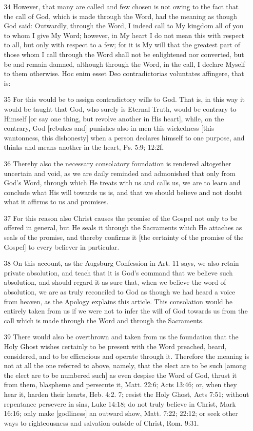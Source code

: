 {34 However, that many are called and few chosen is not owing to the fact that the call of God, which is made through the Word, had the meaning as though God said: Outwardly, through the Word, I indeed call to My kingdom all of you to whom I give My Word; however, in My heart I do not mean this with respect to all, but only with respect to a few; for it is My will that the greatest part of those whom I call through the Word shall not be enlightened nor converted, but be and remain damned, although through the Word, in the call, I declare Myself to them otherwise. Hoc enim esset Deo contradictorias voluntates affingere, that is:

35 For this would be to assign contradictory wills to God. That is, in this way it would be taught that God, who surely is Eternal Truth, would be contrary to Himself [or say one thing, but revolve another in His heart], while, on the contrary, God [rebukes and] punishes also in men this wickedness [this wantonness, this dishonesty] when a person declares himself to one purpose, and thinks and means another in the heart, Ps. 5:9; 12:2f.

36 Thereby also the necessary consolatory foundation is rendered altogether uncertain and void, as we are daily reminded and admonished that only from God’s Word, through which He treats with us and calls us, we are to learn and conclude what His will towards us is, and that we should believe and not doubt what it affirms to us and promises.

37 For this reason also Christ causes the promise of the Gospel not only to be offered in general, but He seals it through the Sacraments which He attaches as seals of the promise, and thereby confirms it [the certainty of the promise of the Gospel] to every believer in particular.

38 On this account, as the Augsburg Confession in Art. 11 says, we also retain private absolution, and teach that it is God’s command that we believe such absolution, and should regard it as sure that, when we believe the word of absolution, we are as truly reconciled to God as though we had heard a voice from heaven, as the Apology explains this article. This consolation would be entirely taken from us if we were not to infer the will of God towards us from the call which is made through the Word and through the Sacraments.

39 There would also be overthrown and taken from us the foundation that the Holy Ghost wishes certainly to be present with the Word preached, heard, considered, and to be efficacious and operate through it. Therefore the meaning is not at all the one referred to above, namely, that the elect are to be such [among the elect are to be numbered such] as even despise the Word of God, thrust it from them, blaspheme and persecute it, Matt. 22:6; Acts 13:46; or, when they hear it, harden their hearts, Heb. 4:2. 7; resist the Holy Ghost, Acts 7:51; without repentance persevere in sins, Luke 14:18; do not truly believe in Christ, Mark 16:16; only make [godliness] an outward show, Matt. 7:22; 22:12; or seek other ways to righteousness and salvation outside of Christ, Rom. 9:31.

}
